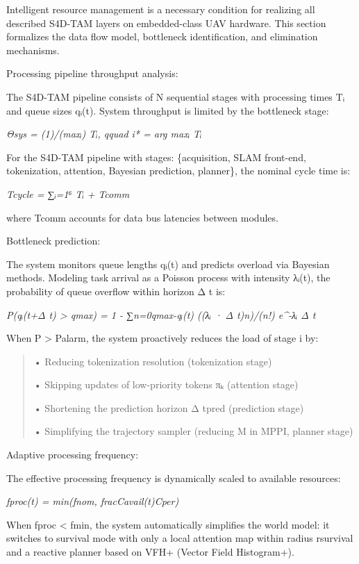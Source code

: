\documentclass[
]{article}
\begin{document}
Intelligent resource management is a necessary condition for realizing
all described S4D-TAM layers on embedded-class UAV hardware. This
section formalizes the data flow model, bottleneck identification, and
elimination mechanisms.

Processing pipeline throughput analysis:

The S4D-TAM pipeline consists of N sequential stages with processing
times Tᵢ and queue sizes qᵢ(t). System throughput is limited by the
bottleneck stage:

\emph{Θsys = (1)/(maxᵢ) Tᵢ, qquad i* = arg maxᵢ Tᵢ}

For the S4D-TAM pipeline with stages: \{acquisition, SLAM front-end,
tokenization, attention, Bayesian prediction, planner\}, the nominal
cycle time is:

\emph{Tcycle = ∑ᵢ=1⁶ Tᵢ + Tcomm}

where Tcomm accounts for data bus latencies between modules.

Bottleneck prediction:

The system monitors queue lengths qᵢ(t) and predicts overload via
Bayesian methods. Modeling task arrival as a Poisson process with
intensity λᵢ(t), the probability of queue overflow within horizon Δ t
is:

\emph{P(qᵢ(t+Δ t) \textgreater{} qmax) = 1 - ∑n=0qmax-qᵢ(t) ((λᵢ · Δ
t)n)/(n!) e\^{}-λᵢ Δ t}

When P \textgreater{} Palarm, the system proactively reduces the load of
stage i by:

\begin{quote}
• Reducing tokenization resolution (tokenization stage)

• Skipping updates of low-priority tokens πₖ (attention stage)

• Shortening the prediction horizon Δ tpred (prediction stage)

• Simplifying the trajectory sampler (reducing M in MPPI, planner stage)
\end{quote}

Adaptive processing frequency:

The effective processing frequency is dynamically scaled to available
resources:

\emph{fproc(t) = min(fnom, fracCavail(t)Cper)}

When fproc \textless{} fmin, the system automatically simplifies the
world model: it switches to survival mode with only a local attention
map within radius rsurvival and a reactive planner based on VFH+ (Vector
Field Histogram+).
\end{document}
